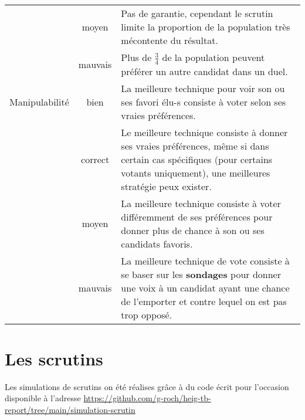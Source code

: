 \documentclass[../report]{subfiles}
\begin{document}
\begin{table}
\begin{center}
\begin{tabular}{p{8em}|c|p{28em}}
      \cline{2-3}
                       & \cellcolor{orange}moyen & Pas de garantie, cependant le scrutin limite la proportion de la population très mécontente du résultat. \\
      \cline{2-3}
                       & \cellcolor{red}mauvais & Plus de $\frac{3}{4}$ de la population peuvent préférer un autre candidat dans un duel. \\
      \hline
      Manipulabilité & \cellcolor{green}bien & La meilleure technique pour voir son ou ses favori élu-s consiste à voter selon ses vraies préférences. \\
      \cline{2-3}
                     & \cellcolor{green!25!yellow}correct & Le meilleure technique consiste à donner ses vraies préférences, même si dans certain cas spécifiques (pour certains votants uniquement), une meilleures stratégie peux exister. \\
      \cline{2-3}
                     & \cellcolor{orange}moyen & La meilleure technique consiste à voter différemment de ses préférences pour donner plus de chance à son ou ses candidats favoris. \\
      \cline{2-3}
                     & \cellcolor{red}mauvais & La meilleure technique de vote consiste à se baser sur les \textbf{sondages} pour donner une voix à un candidat ayant une chance de l'emporter et contre lequel on est pas trop opposé. \\
      \hline
    \end{tabular}
  \end{center}
  \end{table}

  \chapter{Les scrutins}
  
  Les simulations de scrutins on été réalises grâce à du code écrit pour l'occasion disponible 
  à l'adresse \url{https://github.com/g-roch/heig-tb-report/tree/main/simulation-scrutin}
\end{document}

